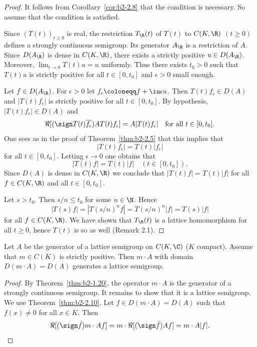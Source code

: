 \begin{proof}%
It follows from  Corollary~\ref{cor:b2-2.8} that the condition is necessary.
So assume that the condition is satisfied.

Since $(T(t))_{t \geq 0}$ is real, the restriction $T_{\R}(t)$ of\/ $T(t)$ to $C(K,\R)$ $(t \geq 0)$ defines a strongly continuous semigroup.
Its generator $A_{\R}$ is a restriction of\/ $A$.
Since $D(A_{\R})$ is dense in $C(K,\R)$, there exists a strictly positive $u \in D(A_{\R})$.
Moreover, $\lim_{t \to 0} T(t)u = u$ uniformly.
Thus there exists $t_{0} > 0$ such that $T(t)u$ is strictly positive for all $t \in [0,t_{0}]$ and $ \epsilon > 0 $ small enough.
 
Let $f \in D(A_{\R})$.
For $\epsilon > 0$ let $f_{\epsilon} \coloneqq f + \iu \epsilon u$.
Then $T(t)f_{\epsilon} \in D(A)$ and $|T(t)f_{\epsilon}|$ is strictly positive for all $t \in [0,t_{0}]$.
By hypothesis, $|T(t)f_{\epsilon}| \in D(A)$ and 
\[
\Re[(\sign T(t)\overline{f_{\epsilon}})AT(t)f_{\epsilon}] = A|T(t)f_{\epsilon}|
\quad \text{for all $t \in [0,t_{0}]$}.
\]
One sees as in the proof of Theorem~\ref{thm:b2-2.5} that this implies that 
%
\[
	|T(t)f_{\epsilon}| = T(t)|f_{\epsilon}| 
\]
%
for all $t \in [0,t_{0}]$.
Letting $\epsilon \to 0$ one obtains that 
%
\[
	 |T(t)f| = T(t)|f| \quad (t \in [0,t_{0}]) .
\]
%
Since $D(A)$ is dense in $C(K,\R)$ we conclude that $|T(t)f| = T(t)|f|$ for all $f \in C(K,\R)$ and all $t \in [0,t_{0}]$.

Let $s > t_{0}$.
Then $s/n \leq t_{0}$ for some $n \in \N$.
Hence 
%
\[
	|T(s)f| = |T(s/n)^{n}f| = T(s/n)^{n}|f| = T(s)|f|
\]
%
for all $f \in C(K,\R)$.
We have shown that $T_{\R}(t)$ is a lattice homomorphism for all $t \geq 0$,  hence $T(t)$ is so as well (\cf Remark 2.1).
\end{proof}
\begin{corollary}\label{cor:b2-2.11}
Let $A$ be the generator of a lattice semigroup on $C(K,\C)$ ($K$ compact).
Assume that  $m \in C(K)$ is strictly positive.
Then  $m \cdot A$ with domain $D(m \cdot A) = D(A)$ generates a lattice semigroup.
\end{corollary}
\begin{proof}
By Theorem~\ref{thm:b2-1.20}, the operator  $m \cdot A$ is the generator of a strongly continuous semigroup.
It remains to show that it is a lattice semigroup.
We use Theorem~\ref{thm:b2-2.10}.
Let $f \in D(m \cdot A) = D(A)$ such that $f(x) \neq 0$ for all $x \in K$.
Then 
\[
\Re[(\sign \bar{f})m \cdot Af] = m \cdot \Re[(\sign \bar{f})Af] = m \cdot A|f|.
\qedhere
\]
\end{proof}

